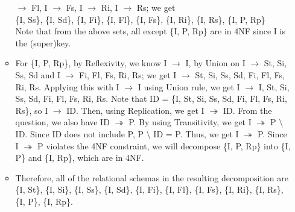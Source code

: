\documentclass[12pt]{article}
\begin{document}
\begin{enumerate}
\begin{itemize}
                $\longrightarrow$ Fl, I $\longrightarrow$ Fs, I
                $\longrightarrow$ Ri, I $\longrightarrow$ Rs; we get \\
                \{I, Ss\}, \{I, Sd\}, \{I, Fi\}, \{I, Fl\}, \{I, Fs\}, \{I,
                Ri\}, \{I, Rs\}, \{I, P, Rp\} \\
                Note that from the above sets, all except \{I, P, Rp\} are in
                4NF since I is the (super)key.
          \item For \{I, P, Rp\}, by Reflexivity, we know I $\longrightarrow$ I,
                by Union on I $\longrightarrow$ St, Si, Ss, Sd and I
                $\longrightarrow$ Fi, Fl, Fs, Ri, Rs; we get I $\longrightarrow$
                St, Si, Ss, Sd, Fi, Fl, Fs, Ri, Rs. Applying this with I
                $\longrightarrow$ I using Union rule, we get I $\longrightarrow$
                I, St, Si, Ss, Sd, Fi, Fl, Fs, Ri, Rs. Note that ID = \{I, St,
                Si, Ss, Sd, Fi, Fl, Fs, Ri, Rs\}, so I $\longrightarrow$ ID.
                Then, using Replication, we get I $\twoheadrightarrow$ ID. From
                the question, we also have ID $\twoheadrightarrow$ P. By using
                Transitivity, we get I $\twoheadrightarrow$ P $\setminus$ ID.
                Since ID does not include P, P $\setminus$ ID = P. Thus, we get
                I $\twoheadrightarrow$ P. Since I $\twoheadrightarrow$ P
                violates the 4NF constraint, we will decompose \{I, P, Rp\} into
                \{I, P\} and \{I, Rp\}, which are in 4NF.
          \item Therefore, all of the relational schemas in the resulting
                decomposition are \{I, St\}, \{I, Si\}, \{I, Ss\}, \{I, Sd\},
                \{I, Fi\}, \{I, Fl\}, \{I, Fs\}, \{I, Ri\}, \{I, Rs\}, \{I, P\},
                \{I, Rp\}.
        \end{itemize}


\end{enumerate}
\end{document}
